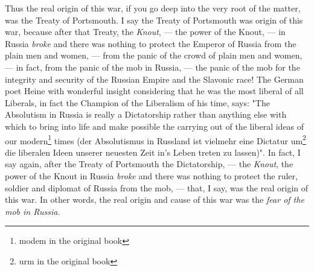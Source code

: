 Thus the real origin of this war, if you go deep into the very root of the matter, was the Treaty of Portsmouth.
I say the Treaty of Portsmouth was origin of this war, because after that Treaty, the \emph{Knout}, --- the power of the Knout, --- in Russia \emph{broke} and there was nothing to protect the Emperor of Russia from the plain men and women, --- from the panic of the crowd of plain men and women, --- in fact, from the panic of the mob in Russia, --- the panic of the mob for the integrity and security of the Russian Empire and the Slavonic race!
The German poet Heine  with wonderful insight considering that he was the most liberal of all Liberals, in fact the Champion of the Liberalism of his time, says: "The Absolutism in Russia is really a Dictatorship rather than anything else with which to bring into life and make possible the carrying out of the liberal ideas of our modern\footnote{modem in the original book} times (der Absolutismus in Russland ist vielmehr eine Dictatur um\footnote{urm in the original book} die liberalen Ideen unserer neuesten Zeit in's Leben treten zu lassen)".
In fact, I say again, after the Treaty of Portsmouth the Dictatorship, --- the \emph{Knout}, the power of the Knout in Russia \emph{broke} and there was nothing to protect the ruler, soldier and diplomat of Russia from the mob, --- that, I say, was the real origin of this war.
In other words, the real origin and cause of this war was the \emph{fear of the mob in Russia}.

